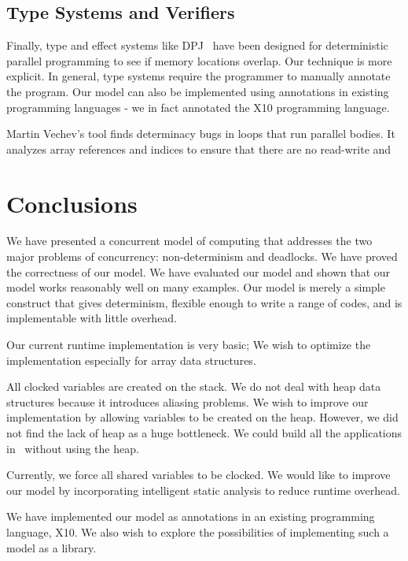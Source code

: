 \documentclass[10pt, conference, compsocconf]{IEEEtran}
\begin{document}
\subsection{Type Systems and Verifiers} 
 
Finally, type and effect systems like DPJ~\cite{bocchino2009type} 
 have been designed for deterministic parallel programming to see if
memory locations overlap. Our technique is more explicit. 
In general, type systems require the programmer to manually annotate the program. Our model can also be implemented using annotations in existing
programming languages - we in fact annotated the X10 programming language.

Martin Vechev's tool \cite{vechev2011automatic}
finds determinacy bugs in loops that run parallel bodies. It analyzes
array references and indices to ensure that there are no read-write and 




\section{Conclusions}
\label{sec:conclusions}
We have presented a concurrent model of computing that addresses the
two major problems of concurrency: non-determinism and deadlocks.
We have proved the correctness of our model. We have evaluated
our model and shown that our model works reasonably well on many
examples.
Our model is merely a simple construct that gives determinism,
flexible enough to write a range of codes, and is implementable with little overhead.

Our current runtime implementation is very basic; 
We wish to optimize
the implementation especially for array data structures.

All clocked variables are created on the stack.
We do not deal with heap data structures because
it introduces aliasing problems.
We wish to improve
our implementation by allowing variables to be created on the heap.
However, we did not find the lack of heap as a huge bottleneck.
We could build all the applications in~ without
using the heap.

Currently, we force all shared variables to be clocked. We would
like to improve our model by incorporating intelligent
static analysis to reduce runtime overhead.


We have implemented our model as annotations in an existing
programming language, X10.
We also wish to explore the possibilities of implementing such a model
as a library.
\end{document}
